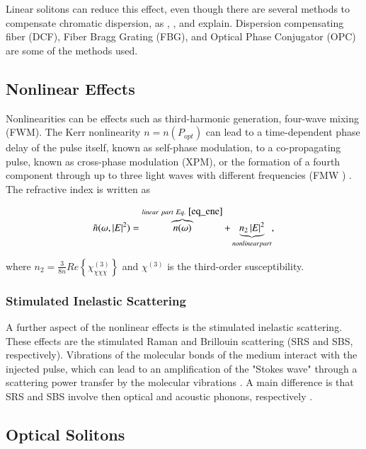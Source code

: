        Linear solitons can reduce this effect, even though there are several methods to compensate chromatic dispersion, as \cite{AgrawalBook}, \cite{dudley_taylor_2010},  and \citep{Udayakumar2013ChromaticDC} explain. Dispersion compensating fiber (DCF), Fiber Bragg Grating (FBG), and Optical Phase Conjugator (OPC) are some of the methods used.
        
       

    \subsection{Nonlinear Effects}

        Nonlinearities can be effects such as third-harmonic generation, four-wave mixing (FWM). The Kerr nonlinearity $n = n(P_{opt})$
        can lead to a time-dependent phase delay of the pulse itself, known as self-phase modulation, to a co-propagating pulse, known as cross-phase modulation (XPM), or the formation of a fourth component through up to three light waves with different frequencies (FMW ) \cite{rein}. The refractive index is written as
        
        
        \begin{equation}
            \tilde{n} (\omega, \left| E \right|^2) = \overbrace{n(\omega)}^{linear \ part \ Eq. \ \eqref{eq_ene}} + \underbrace{ n_2 \left| E \right|^2}_{nonlinear part},
        \end{equation} 
       
       where $n_2 = \frac{3}{8n}Re\left\{ \chi^{(3)}_{\chi \chi \chi}\right\}$ and $\chi^{(3)}$ is the third-order susceptibility.
   
   \subsubsection{Stimulated Inelastic Scattering}
        A further aspect of the nonlinear effects is the stimulated inelastic scattering. These effects are the stimulated Raman and Brillouin scattering (SRS and SBS, respectively). Vibrations of the molecular bonds of the medium interact with the injected pulse, which can lead to an amplification of the "Stokes wave" through a scattering power transfer by the molecular vibrations \cite{rein}. A main difference is that SRS and SBS involve then optical and acoustic phonons, respectively \cite{AgrawalBook}.
        
    \subsection{Optical Solitons}
    
